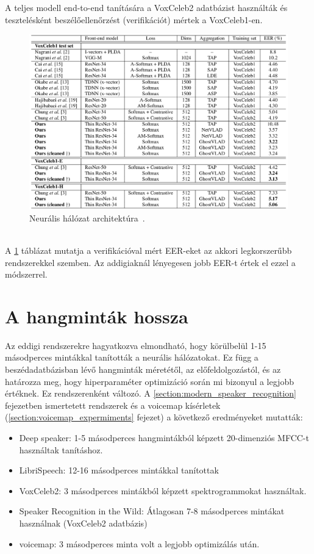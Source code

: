 A teljes modell end-to-end tanítására a VoxCeleb2 adatbázist használták és tesztelésként beszélőellenőrzést (verifikációt) mértek a VoxCeleb1-en.
\begin{figure}[!ht]
	\centering
	\includegraphics[width=150mm, keepaspectratio]{figures/frame-cnn-results.png}
	\caption{Neurális hálózat architektúra~\cite{speaker_in_the_wild}.}
	\label{fig:frame-cnn-results}
\end{figure}
\ \\
A \ref{fig:frame-cnn-results} táblázat mutatja a verifikációval mért EER-eket az akkori legkorszerűbb rendszerekkel szemben. Az addigiaknál lényegesen jobb EER-t értek el ezzel a módszerrel.

\section{A hangminták hossza} \label{section:voice-length}

Az eddigi rendszerekre hagyatkozva elmondható, hogy körülbelül 1-15 másodperces mintákkal tanították a neurális hálózatokat. Ez függ a beszédadatbázisban lévő hangminták méretétől, az előfeldolgozástól, és az határozza meg, hogy hiperparaméter optimizáció során mi bizonyul a legjobb értéknek. Ez rendszerenként változó. A \ref{section:modern_speaker_recognition} fejezetben ismertetett rendszerek és a voicemap kísérletek (\ref{section:voicemap_expermiments} fejezet) a következő eredményeket mutatták:

\begin{itemize}
	\item Deep speaker: 1-5 másodperces hangmintákból képzett 20-dimenziós MFCC-t használtak tanításhoz.
	\item LibriSpeech: 12-16 másodperces mintákkal tanítottak
	\item VoxCeleb2: 3 másodperces mintákból képzett spektrogrammokat használtak.
	\item Speaker Recognition in the Wild: Átlagosan 7-8 másodperces mintákat használnak (VoxCeleb2 adatbázis)
	\item voicemap: 3 másodperces minta volt a legjobb optimizálás után.
\end{itemize}

